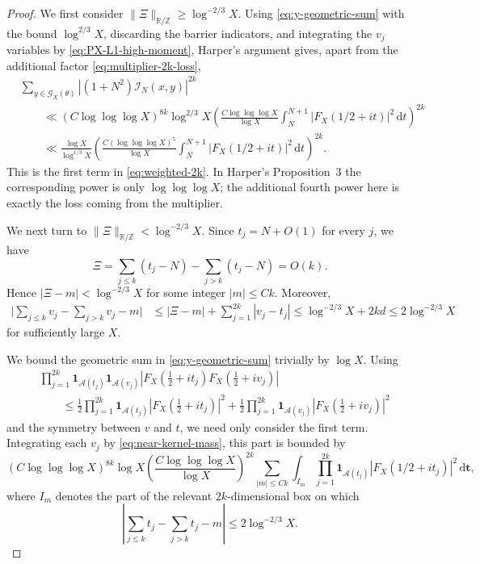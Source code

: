 \documentclass[a4paper,12pt,reqno]{amsart}
\numberwithin{equation}{section}
\theoremstyle{remark}
\newcommand{\R}{\mathbb{R}}
\newcommand{\Z}{\mathbb{Z}}
\begin{document}
\begin{proof}
We first consider
\(
 \|\Xi\|_{\R/\Z}\geq\log^{-2/3}X.
\)
Using \eqref{eq:y-geometric-sum} with the bound $\log^{2/3}X$,
discarding the barrier indicators, and integrating the $v_j$ variables
by \eqref{eq:PX-L1-high-moment}, Harper's argument gives, apart from the
additional factor \eqref{eq:multiplier-2k-loss},
\[
 \begin{aligned}
 &\sum_{y\in{\mathcal G}_X(\theta)}
 |(1+N^2){\mathcal I}_N(x,y)|^{2k}\\
 &\qquad\ll
 (C\log\log\log X)^{8k}\log^{2/3}X
 \left(
 \frac{C\log\log\log X}{\log X}
 \int_N^{N+1}|F_X(1/2+it)|^2\,\mathrm{d}t
 \right)^{2k}\\
 &\qquad \ll \frac{\log X}{\log^{1/3}X}
 \left(
 \frac{C(\log\log\log X)^5}{\log X}
 \int_N^{N+1}|F_X(1/2+it)|^2\,\mathrm{d}t
 \right)^{2k}.
  \end{aligned}
\]
This is the first term in \eqref{eq:weighted-2k}.  In Harper's
Proposition~3 the corresponding power is only
$\log\log\log X$; the additional fourth power here is exactly the loss
coming from the multiplier.

We next turn to \( \|\Xi\|_{\R/\Z}<\log^{-2/3}X.
\)
Since $t_j=N+O(1)$ for every $j$, we have
\[
 \Xi
 =
 \sum_{j\leq k}(t_j-N)-\sum_{j>k}(t_j-N)
 =O(k).
\] 
Hence
\( |\Xi-m|<\log^{-2/3}X
\)
for some integer $|m|\leq Ck$.  Moreover,
\[
 \begin{aligned}
 \bigg|
 \sum_{j\leq k}v_j-\sum_{j>k}v_j-m
 \bigg|
 &\leq
 |\Xi-m|+\sum_{j=1}^{2k}|v_j-t_j|\leq
 \log^{-2/3}X+2kd
 \leq2\log^{-2/3}X
 \end{aligned}
\]
for sufficiently large $X$.

We bound the geometric sum in \eqref{eq:y-geometric-sum} trivially by
$\log X$.  Using
\[
 \begin{aligned}
 &\prod_{j=1}^{2k}
 \mathbf 1_{{\mathcal A}(t_j)}
 \mathbf 1_{{\mathcal A}(v_j)}
 |F_X(\frac12+it_j)F_X(\frac12+iv_j)|\\
 &\qquad\leq
 \frac12\prod_{j=1}^{2k}
 \mathbf 1_{{\mathcal A}(t_j)}
 |F_X(\frac12+it_j)|^2
 +
 \frac12\prod_{j=1}^{2k}
 \mathbf 1_{{\mathcal A}(v_j)}
 |F_X(\frac12+iv_j)|^2
 \end{aligned}
\]
and the symmetry between $v$ and $t$, we need only consider the first
term.  Integrating each $v_j$ by
\eqref{eq:near-kernel-mass}, this part is bounded by
\begin{equation}\label{eq:near-integer-reduction}
 (C\log\log\log X)^{8k}\log X
 \left(\frac{C\log\log\log X}{\log X}\right)^{2k}
 \sum_{|m|\leq Ck}
 \int_{I_m}
 \prod_{j=1}^{2k}
 \mathbf 1_{{\mathcal A}(t_j)}
 |F_X(1/2+it_j)|^2\,\mathrm{d}\mathbf t,
\end{equation}
where $I_m$ denotes the part of the relevant $2k$-dimensional box on
which
\[
 \left|
 \sum_{j\leq k}t_j-\sum_{j>k}t_j-m
 \right|
 \leq2\log^{-2/3}X.
\]


\end{proof}
\end{document}
